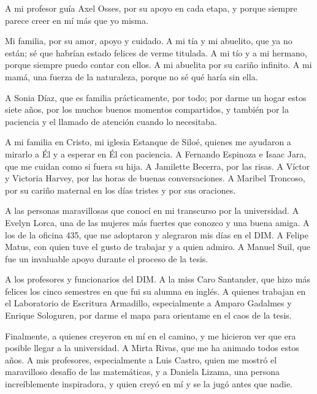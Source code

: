 \documentclass[upright, contnum]{umemoria}
\begin{document}
\begin{thanks}

A mi profesor guía Axel Osses, por su apoyo en cada etapa, y porque siempre parece creer en mí más que yo misma.

Mi familia, por su amor, apoyo y cuidado. A mi tía y mi abuelito, que ya no están; sé que habrían estado felices de verme titulada. A mi tío y a mi hermano, porque siempre puedo contar con ellos. A mi abuelita por su cariño infinito. A mi mamá, una fuerza de la naturaleza, porque no sé qué haría sin ella.

A Sonia Díaz, que es familia prácticamente, por todo; por darme un hogar estos siete años, por los muchos buenos momentos compartidos, y también por la paciencia y el llamado de atención cuando lo necesitaba.

A mi familia en Cristo, mi iglesia Estanque de Siloé, quienes me ayudaron a mirarlo a Él y a esperar en Él con paciencia. A Fernando Espinoza e Isaac Jara, que me cuidan como si fuera su hija. A Jamilette Becerra, por las risas. A Víctor y Victoria Harvey, por las horas de buenas conversaciones. A Maribel Troncoso, por su cariño maternal en los días tristes y por sus oraciones.

A las personas maravillosas que conocí en mi transcurso por la universidad. A Evelyn Lorca, una de las mujeres más fuertes que conozco y una buena amiga. A los de la oficina 435, que me adoptaron y alegraron mis días en el DIM. A Felipe Matus, con quien tuve el gusto de trabajar y a quien admiro. A Manuel Suil, que fue un invaluable apoyo durante el proceso de la tesis.

A los profesores y funcionarios del DIM. A la miss Caro Santander, que hizo más felices los cinco semestres en que fui su alumna en inglés. A quienes trabajan en el Laboratorio de Escritura Armadillo, especialmente a Amparo Gadalmes y Enrique Sologuren, por darme el mapa para orientame en el caos de la tesis.


Finalmente, a quienes creyeron en mí en el camino, y me hicieron ver que era posible llegar a la universidad. A Mirta Rivas, que me ha animado todos estos años. A mis profesores, especialmente a Luis Castro, quien me mostró el maravilloso desafío de las matemáticas, y a Daniela Lizama, una persona increíblemente inspiradora, y quien creyó en mí y se la jugó antes que nadie. 


\end{thanks}

\cleardoublepage
\tableofcontents
\cleardoublepage
\listoftables
\cleardoublepage
\listoffigures

\mainmatter











\appendix

\end{document}
